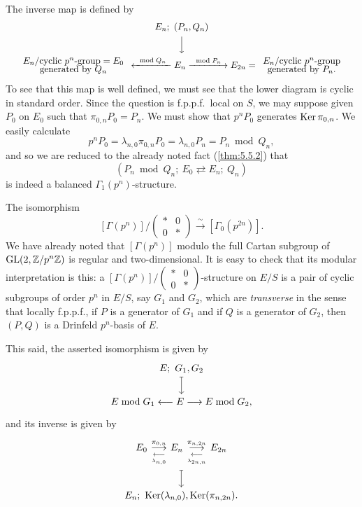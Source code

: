 The inverse map is defined by
\[
\resizebox{\linewidth}{!}{$\displaystyle
\begin{array}{c}
E_n;\ (P_n, Q_n) \\[4pt]
\Big\downarrow \\[6pt]
\begin{array}{c} E_n/\text{cyclic } p^n\text{-group} = E_0 \\[-3pt] \text{generated by } Q_n \end{array}
\xleftarrow{\ \bmod Q_n\ } E_n \xrightarrow{\ \bmod P_n\ }
E_{2n} = \begin{array}{c} E_n/\text{cyclic } p^n\text{-group} \\[-3pt] \text{generated by } P_n . \end{array}
\end{array}
$}
\]
To see that this map is well defined, we must see that the lower diagram is cyclic in standard order. Since the question is f.p.p.f.\ local on $S$, we may suppose given $P_0$ on $E_0$ such that $\pi_{0,n} P_0 = P_n$. We must show that $p^n P_0$ generates $\operatorname{Ker}\pi_{0,n}$. We easily calculate
\[
p^n P_0 = \lambda_{n,0}\pi_{0,n} P_0 = \lambda_{n,0} P_n = P_n \bmod Q_n ,
\]
and so we are reduced to the already noted fact (\ref{thm:5.5.2}) that
\[
(P_n \bmod Q_n;\ E_0 \rightleftarrows E_n;\ Q_n)
\]
is indeed a balanced $\Gamma_1(p^n)$-structure.

\kmitem\label{item:11.3.5}
The isomorphism
\[
[\Gamma(p^n)]/\begin{pmatrix} * & 0 \\ 0 & * \end{pmatrix} \xrightarrow{\ \sim\ } [\Gamma_0(p^{2n})] .
\]
We have already noted that $[\Gamma(p^n)]$ modulo the full Cartan subgroup of $\operatorname{GL}(2, \mathbb{Z}/p^n\mathbb{Z})$ is regular and two-dimensional. It is easy to check that its modular interpretation is this: a $[\Gamma(p^n)]/\begin{pmatrix} * & 0 \\ 0 & * \end{pmatrix}$-structure on $E/S$ is a pair of cyclic subgroups of order $p^n$ in $E/S$, say $G_1$ and $G_2$, which are \emph{transverse} in the sense that locally f.p.p.f., if $P$ is a generator of $G_1$ and if $Q$ is a generator of $G_2$, then $(P,Q)$ is a Drinfeld $p^n$-basis of $E$.

This said, the asserted isomorphism is given by
\[
\begin{tikzcd}[row sep=1.8em]
E;\ G_1, G_2 \arrow[d, mapsto] \\
E \bmod G_1 \longleftarrow E \longrightarrow E \bmod G_2 ,
\end{tikzcd}
\]
and its inverse is given by
\[
\begin{tikzcd}[row sep=1.8em]
E_0 \kmdual{\pi_{0,n}}{\lambda_{n,0}} E_n \kmdual{\pi_{n,2n}}{\lambda_{2n,n}} E_{2n} \arrow[d, mapsto] \\
E_n;\ \Ker(\lambda_{n,0}), \Ker(\pi_{n,2n}) .
\end{tikzcd}
\]